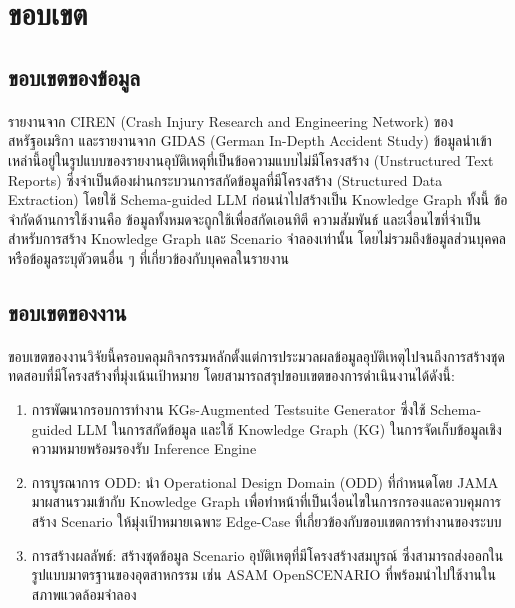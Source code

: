 \section{ขอบเขต}\label{sec:scope}

\subsection{ขอบเขตของข้อมูล}\label{subsec:data-scope}
\paragraph{}รายงานจาก CIREN (Crash Injury Research and Engineering Network) ของสหรัฐอเมริกา และรายงานจาก GIDAS (German In-Depth Accident Study) ข้อมูลนำเข้าเหล่านี้อยู่ในรูปแบบของรายงานอุบัติเหตุที่เป็นข้อความแบบไม่มีโครงสร้าง (Unstructured Text Reports) ซึ่งจำเป็นต้องผ่านกระบวนการสกัดข้อมูลที่มีโครงสร้าง (Structured Data Extraction) โดยใช้ Schema-guided LLM ก่อนนำไปสร้างเป็น Knowledge Graph ทั้งนี้ ข้อจำกัดด้านการใช้งานคือ ข้อมูลทั้งหมดจะถูกใช้เพื่อสกัดเอนทิตี ความสัมพันธ์ และเงื่อนไขที่จำเป็นสำหรับการสร้าง Knowledge Graph และ Scenario จำลองเท่านั้น โดยไม่รวมถึงข้อมูลส่วนบุคคลหรือข้อมูลระบุตัวตนอื่น ๆ ที่เกี่ยวข้องกับบุคคลในรายงาน

\subsection{ขอบเขตของงาน}\label{subsec:work-scope}

\paragraph{}ขอบเขตของงานวิจัยนี้ครอบคลุมกิจกรรมหลักตั้งแต่การประมวลผลข้อมูลอุบัติเหตุไปจนถึงการสร้างชุดทดสอบที่มีโครงสร้างที่มุ่งเน้นเป้าหมาย โดยสามารถสรุปขอบเขตของการดำเนินงานได้ดังนี้:

\begin{enumerate}[label=\arabic*.)]
    \item การพัฒนากรอบการทำงาน KGs-Augmented Testsuite Generator ซึ่งใช้ Schema-guided LLM ในการสกัดข้อมูล และใช้ Knowledge Graph (KG) ในการจัดเก็บข้อมูลเชิงความหมายพร้อมรองรับ Inference Engine
    \item การบูรณาการ ODD: นำ Operational Design Domain (ODD) ที่กำหนดโดย JAMA มาผสานรวมเข้ากับ Knowledge Graph เพื่อทำหน้าที่เป็นเงื่อนไขในการกรองและควบคุมการสร้าง Scenario ให้มุ่งเป้าหมายเฉพาะ Edge-Case ที่เกี่ยวข้องกับขอบเขตการทำงานของระบบ
    \item การสร้างผลลัพธ์: สร้างชุดข้อมูล Scenario อุบัติเหตุที่มีโครงสร้างสมบูรณ์ ซึ่งสามารถส่งออกในรูปแบบมาตรฐานของอุตสาหกรรม เช่น ASAM OpenSCENARIO ที่พร้อมนำไปใช้งานในสภาพแวดล้อมจำลอง
\end{enumerate}

